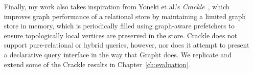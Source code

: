Finally, my work also takes inspiration from Yoneki et al.'s
\textit{Crackle}~\cite{crackle}, which  improves graph performance of a
relational store by maintaining a limited graph store in memory, which is
periodically filled using graph-aware prefetchers to ensure topologically
local vertices are preserved in the store. Crackle does not support pure-relational or hybrid queries, however,
nor does it attempt to present a declarative
query interface in the way that Grapht does. We replicate and extend some of
the Crackle results in Chapter~\ref{ch:evaluation}.
